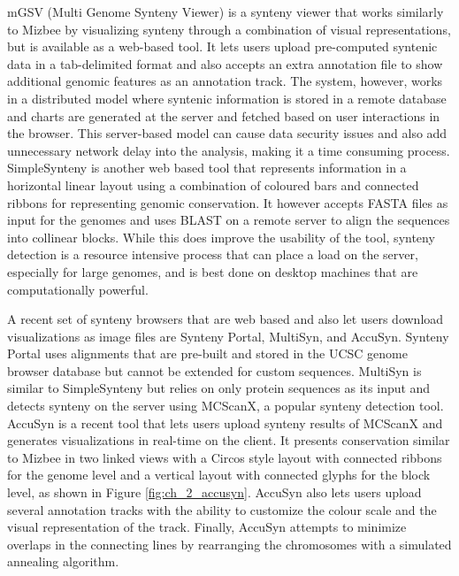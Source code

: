 mGSV (Multi Genome Synteny Viewer) is a synteny viewer that works similarly to Mizbee by visualizing synteny through a combination of visual representations, but is available as a web-based tool\cite{revanna2011gsv}. It lets users upload pre-computed syntenic data in a tab-delimited format and also accepts an extra annotation file to show additional genomic features as an annotation track. The system, however, works in a distributed model where syntenic information is stored in a remote database and charts are generated at the server and fetched based on user interactions in the browser. This server-based model can cause data security issues and also add unnecessary network delay into the analysis, making it a time consuming process. SimpleSynteny is another web based tool that represents information in a horizontal linear layout using a combination of coloured bars and connected ribbons for representing genomic conservation\cite{veltri2016simplesynteny}. It however accepts FASTA files as input for the genomes and uses BLAST\cite{blasttool} on a remote server to align the sequences into collinear blocks. While this does improve the usability of the tool, synteny detection is a resource intensive process that can place a load on the server, especially for large genomes, and is best done on desktop machines that are computationally powerful.

A recent set of synteny browsers that are web based and also let users download visualizations as image files are Synteny Portal, MultiSyn, and AccuSyn. Synteny Portal uses alignments that are pre-built and stored in the UCSC genome browser database but cannot be extended for custom sequences\cite{lee2016syntenyportal}. MultiSyn\cite{baek2016multisyn} is similar to SimpleSynteny but relies on only protein sequences as its input and detects synteny on the server using MCScanX\cite{wang2012mcscanx}, a popular synteny detection tool. AccuSyn\cite{accusyn} is a recent tool that lets users upload synteny results of MCScanX and generates visualizations in real-time on the client. It presents conservation similar to Mizbee in two linked views with a Circos style layout with connected ribbons for the genome level and a vertical layout with connected glyphs for the block level, as shown in Figure \ref{fig:ch_2_accusyn}. AccuSyn also lets users upload several annotation tracks with the ability to customize the colour scale and the visual representation of the track. Finally, AccuSyn attempts to minimize overlaps in the connecting lines by rearranging the chromosomes with a simulated annealing algorithm.

